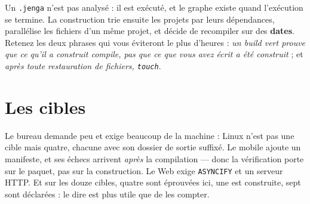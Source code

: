 \documentclass[11pt, a4paper, oneside]{book}
\begin{document}
\begin{partiebilan}
Un \texttt{.jenga} n'est pas analysé : il est exécuté, et le graphe existe quand
l'exécution se termine. La construction trie ensuite les projets par leurs
dépendances, parallélise les fichiers d'un même projet, et décide de recompiler
sur des \textbf{dates}. Retenez les deux phrases qui vous éviteront le plus
d'heures : \emph{un build vert prouve que ce qu'il a construit compile, pas que
ce que vous avez écrit a été construit} ; et \emph{après toute restauration de
fichiers, \texttt{touch}}.
\end{partiebilan}


\part{Les cibles}




\begin{partiebilan}
Le bureau demande peu et exige beaucoup de la machine : Linux n'est pas une cible
mais quatre, chacune avec son dossier de sortie suffixé. Le mobile ajoute un
manifeste, et ses échecs arrivent \emph{après} la compilation --- donc la
vérification porte sur le paquet, pas sur la construction. Le Web exige
\texttt{ASYNCIFY} et un serveur HTTP. Et sur les douze cibles, quatre sont
éprouvées ici, une est construite, sept sont déclarées : le dire est plus utile
que de les compter.
\end{partiebilan}
\end{document}
